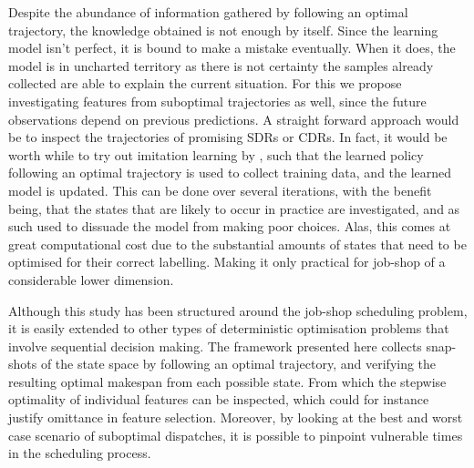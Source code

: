 \documentclass[smallextended]{svjour3}
\begin{document}
	Despite the abundance of information gathered by following an optimal trajectory, the knowledge obtained is not enough by itself. Since the learning model isn't perfect, it is bound to make a mistake eventually. When it does, the model is in uncharted  territory as there is not certainty the samples already collected are able to explain the current situation. For this we propose investigating features from suboptimal trajectories as well, since the future observations depend on previous predictions. 
	 A straight forward approach would be to inspect the trajectories of promising SDRs or CDRs. 
	In fact, it would be worth while to try out imitation learning by \cite{RossB10,RossGB11}, such that the learned policy following an optimal trajectory is used to collect training data, and the learned model is updated. This can be done over several iterations, with the benefit being, that the states that are likely to occur in practice are investigated, and as such used to dissuade the model from making poor choices. Alas, this comes at great computational cost due to the substantial amounts of states that need to be optimised for their correct labelling. Making it only practical for job-shop of a considerable lower dimension. 
	
	
	Although this study has been structured around the job-shop scheduling problem, it is easily extended to other types of deterministic optimisation problems that involve sequential decision making. 	
	The framework presented here collects snap-shots of the state space by following an optimal trajectory, and verifying the resulting optimal makespan from each possible state. 
	From which the stepwise optimality of individual features can be inspected, which could for instance justify omittance in feature selection.  
	Moreover, by looking at the best and worst case scenario of suboptimal dispatches, it is possible to pinpoint vulnerable times in the scheduling process. 
	
	
	
	  
	
	
	
\end{document}
